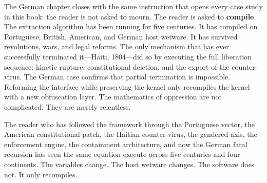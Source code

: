 The German chapter closes with the same instruction that opens every case study in this book: the reader is not asked to mourn. The reader is asked to \textbf{compile}. The extraction algorithm has been running for five centuries. It has compiled on Portuguese, British, American, and German host wetware. It has survived revolutions, wars, and legal reforms. The only mechanism that has ever successfully terminated it---Haiti, 1804---did so by executing the full liberation sequence: kinetic rupture, constitutional deletion, and the export of the counter-virus. The German case confirms that partial termination is impossible. Reforming the interface while preserving the kernel only recompiles the kernel with a new obfuscation layer. The mathematics of oppression are not complicated. They are merely relentless.

The reader who has followed the framework through the Portuguese vector, the American constitutional patch, the Haitian counter-virus, the gendered axis, the enforcement engine, the containment architecture, and now the German fatal recursion has seen the same equation execute across five centuries and four continents. The variables change. The host wetware changes. The software does not. It only recompiles.



